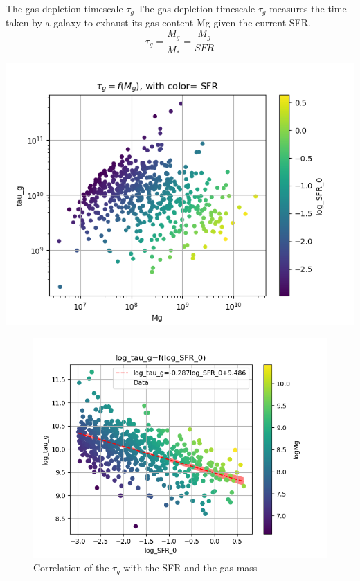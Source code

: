 \documentclass[presentation]{beamer}
\begin{document}
\begin{frame}[label={sec:org40e1c03}]{The gas depletion timescale \(\tau_g\) \label{SEC:tau_g}}
The gas depletion timescale \(\tau_g\) measures the time taken by a galaxy to exhaust its gas content Mg given the current SFR\autocites{nageshSimulationsStarformingMainsequence2023}[][]{pflamm-altenburgFundamentalGasDepletion2009}.
\begin{equation}\label{eq:tau_g}
\tau_g=\frac{M_g}{\dot{M_*}}=\frac{M_g}{SFR}
\end{equation}




\begin{center}
\includegraphics[width=.9\linewidth]{./figs/tau_g-Mg-color_SFR.png}
\end{center}
\begin{figure}[!htpb]
\centering
\includegraphics[width=.9\linewidth]{./figs/log_SFR_0-log_tau_g-color_logMg.png}
\caption{\label{fig:Correlation of the $\tau_g$ with the SFR and the gas mass}Correlation of the \(\tau_g\) with the SFR and the gas mass}
\end{figure}


\end{frame}
\end{document}
